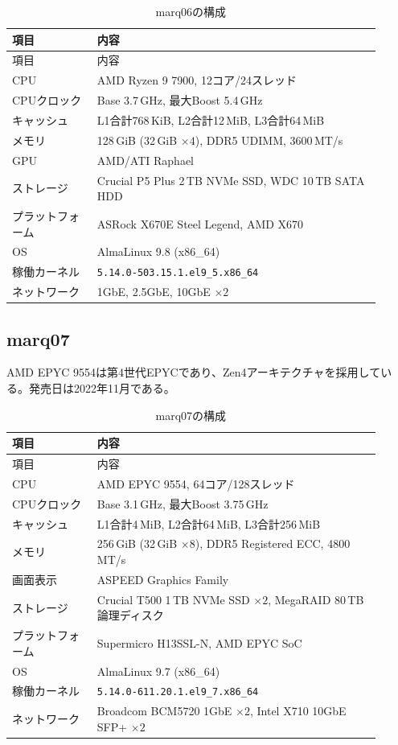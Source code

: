 \documentclass[../main.tex]{subfiles}
\begin{document}
\begingroup
\small
\renewcommand{\arraystretch}{1.2}
\begin{longtable}{|p{0.21\linewidth}|p{0.70\linewidth}|}
\caption{marq06の構成}\label{tab:environment-marq06}\\
\hline
項目 & 内容 \\
\hline
\endfirsthead
\hline
項目 & 内容 \\
\hline
\endhead
CPU & AMD Ryzen 9 7900, 12コア/24スレッド \\
\hline
CPUクロック & Base 3.7\,GHz, 最大Boost 5.4\,GHz \\
\hline
キャッシュ & L1合計768\,KiB, L2合計12\,MiB, L3合計64\,MiB \\
\hline
メモリ & 128\,GiB (32\,GiB $\times 4$), DDR5 UDIMM, 3600\,MT/s \\
\hline
GPU & AMD/ATI Raphael \\
\hline
ストレージ & Crucial P5 Plus 2\,TB NVMe SSD, WDC 10\,TB SATA HDD \\
\hline
プラットフォーム & ASRock X670E Steel Legend, AMD X670 \\
\hline
OS & AlmaLinux 9.8 (x86\_64) \\
\hline
稼働カーネル & \texttt{5.14.0-503.15.1.el9\_5.x86\_64} \\
\hline
ネットワーク & 1GbE, 2.5GbE, 10GbE $\times 2$ \\
\hline
\end{longtable}
\endgroup


\subsection{marq07}
\label{sec:environment-marq07}
AMD EPYC 9554は第4世代EPYCであり、Zen4アーキテクチャを採用している。発売日は2022年11月である。
\begingroup
\small
\renewcommand{\arraystretch}{1.2}
\begin{longtable}{|p{0.21\linewidth}|p{0.70\linewidth}|}
\caption{marq07の構成}\label{tab:environment-marq07}\\
\hline
項目 & 内容 \\
\hline
\endfirsthead
\hline
項目 & 内容 \\
\hline
\endhead
CPU & AMD EPYC 9554, 64コア/128スレッド \\
\hline
CPUクロック & Base 3.1\,GHz, 最大Boost 3.75\,GHz \\
\hline
キャッシュ & L1合計4\,MiB, L2合計64\,MiB, L3合計256\,MiB \\
\hline
メモリ & 256\,GiB (32\,GiB $\times 8$), DDR5 Registered ECC, 4800\,MT/s \\
\hline
画面表示 & ASPEED Graphics Family \\
\hline
ストレージ & Crucial T500 1\,TB NVMe SSD $\times 2$, MegaRAID 80\,TB論理ディスク \\
\hline
プラットフォーム & Supermicro H13SSL-N, AMD EPYC SoC \\
\hline
OS & AlmaLinux 9.7 (x86\_64) \\
\hline
稼働カーネル & \texttt{5.14.0-611.20.1.el9\_7.x86\_64} \\
\hline
ネットワーク & Broadcom BCM5720 1GbE $\times 2$, Intel X710 10GbE SFP+ $\times 2$ \\
\hline
\end{longtable}
\endgroup
\end{document}
